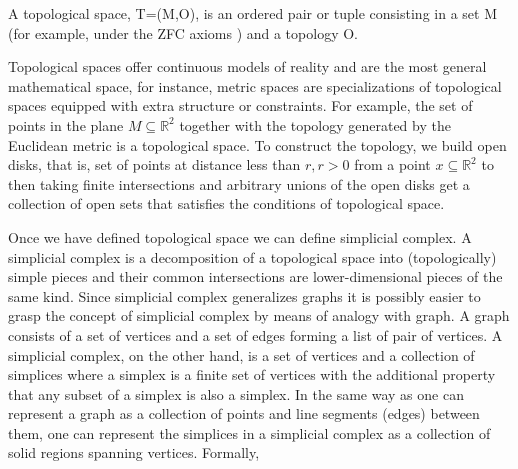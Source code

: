 \documentclass[onecollarge,runningheads]{svjour2}
\begin{document}
\begin{definition}
A topological space, T=(M,O), is an ordered pair or tuple consisting in a set M (for example, under the ZFC axioms \cite{suppes1960axiomatic}) and a topology O. %
 \end{definition}

Topological spaces offer continuous models of reality and are the most general mathematical space, for instance, metric spaces are specializations of topological spaces equipped with extra structure or constraints.
For example, the set of points in the plane $M \subseteq \mathbb{R}^2$ together with the topology generated by the Euclidean metric is a topological space. To construct the topology, we build open disks, that is, set of points at distance less than $r, r > 0$ from a point $x \subseteq \mathbb{R}^2$ to then taking finite intersections and arbitrary unions of the open disks get a collection of open sets that satisfies the conditions of topological space.


Once we have defined topological space we can define simplicial complex. A simplicial complex is a decomposition of a topological space into (topologically) simple pieces and their common intersections are lower-dimensional pieces of the same kind. Since simplicial complex generalizes graphs it is possibly easier to grasp the concept of simplicial complex by means of analogy with graph. 
A graph consists of a set of vertices and a set of edges forming a list of pair of vertices. A simplicial complex, on the other hand, is a set of vertices and a collection of simplices where a simplex is a finite set of vertices with the additional property that any subset of a simplex is also a simplex. In the same way as one can represent a graph as a collection of points and line segments (edges) between them, one can represent the simplices in a simplicial complex as a collection of solid regions spanning vertices. Formally,
\end{document}
